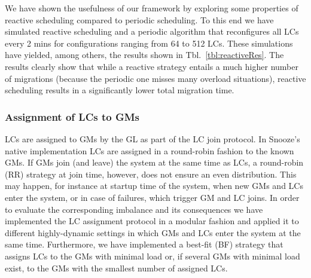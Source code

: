 We have shown the usefulness of our framework by exploring some
properties of reactive scheduling compared to periodic scheduling. To
this end we have simulated reactive scheduling and a periodic
algorithm that reconfigures all LCs every 2 mins for configurations
ranging from 64 to 512 LCs. These simulations have yielded, among
others, the results shown in Tbl.~\ref{tbl:reactiveRes}. The results
clearly show that while a reactive strategy entails a much higher
number of migrations (because the periodic one misses many overload
situations), reactive scheduling results in a significantly lower
total migration time.


\subsubsection{Assignment of LCs to GMs}

LCs are assigned to GMs by the GL as part of the LC join protocol. In
Snooze's native implementation LCs are assigned in a round-robin
fashion to the known GMs. If GMs join (and leave) the system at the
same time as LCs, a round-robin (RR) strategy at join time, however,
does not ensure an even distribution. This may happen, for instance at
startup time of the system, when new GMs and LCs enter the system, or
in case of failures, which trigger GM and LC joins. In order to
evaluate the corresponding imbalance and its consequences we have
implemented the LC assignment protocol in a modular fashion and
applied it to different highly-dynamic settings in which GMs and LCs
enter the system at the same time. Furthermore, we have implemented a
best-fit (BF) strategy that assigns LCs to the GMs with minimal load
or, if several GMs with minimal load exist, to the GMs with the
smallest number of assigned LCs.




